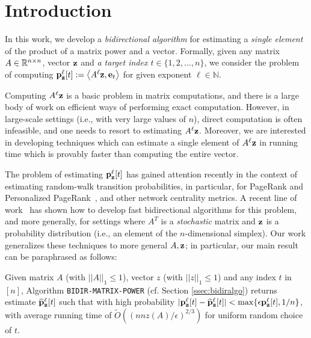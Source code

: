\section{Introduction}
\label{sec:intro}

In this work, we develop a \emph{bidirectional algorithm} for estimating a \emph{single element} of the product of a matrix power and a vector.
Formally, given any matrix $A\in\mathbb{R}^{n\times n}$, vector $\mathbf{z}$ and \emph{a target index $t\in\{1,2,\ldots,n\}$}, we consider the problem of computing ${\mathbf{p}}_\mathbf{z}^{\ell}[t] := \left< A^{\ell}\mathbf{z}, \mathbf{e}_t \right>$ for given exponent $\ell\in\mathbb{N}$.

Computing $A^{\ell}\mathbf{z}$ is a basic problem in matrix computations, and there is a large body of work on efficient ways of performing exact computation. 
However, in large-scale settings (i.e., with very large values of $n$), direct computation is often infeasible, and one needs to resort to estimating $A^{\ell}\mathbf{z}$.
Moreover, we are interested in developing techniques which can estimate a single element of $A^{\ell}\mathbf{z}$ in running time which is provably faster than computing the entire vector. 

The problem of estimating ${\mathbf{p}}_\mathbf{z}^{\ell}[t]$ has gained attention recently in the context of estimating random-walk transition probabilities, in particular, for PageRank and Personalized PageRank~\cite{Page1999}, and other network centrality metrics. 
A recent line of work~\cite{Lofgren2014,lofgren2016personalized,banerjee2015fast} has shown how to develop fast bidirectional algorithms for this problem, and more generally, for settings where $A^T$ is a \emph{stochastic} matrix and $\mathbf{z}$ is a probability distribution (i.e., an element of the $n$-dimensional simplex).
Our work generalizes these techniques to more general $A,\mathbf{z}$; in particular, our main result can be paraphrased as follows:
\begin{proposition}
Given matrix $A$ (with $||A||_1\leq 1$), vector $z$ (with $||z||_1\leq 1$) and any index $t$ in $[n]$, Algorithm \texttt{BIDIR-MATRIX-POWER} (cf. Section \ref{ssec:bidiralgo}) returns estimate $\widehat{\mathbf{p}}_\mathbf{z}^{\ell}[t]$ such that with high probability $|{\mathbf{p}}_\mathbf{z}^{\ell}[t]-\widehat{\mathbf{p}}_\mathbf{z}^{\ell}[t]|<\max\{\epsilon{\mathbf{p}}_\mathbf{z}^{\ell}[t],1/n\}$, with average running time of $\widetilde{O}\left(\left(nnz(A)/\epsilon\right)^{2/3}\right)$ for uniform random choice of $t$.
\end{proposition}	

